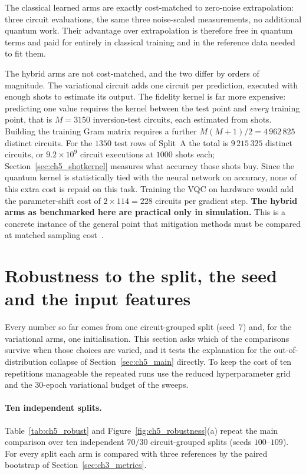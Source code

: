 \documentclass[Thesis.tex]{subfiles}
\begin{document}
The classical learned arms are exactly cost-matched to zero-noise extrapolation:
three circuit evaluations, the same three noise-scaled measurements, no additional
quantum work. Their advantage over extrapolation is therefore free in quantum terms
and paid for entirely in classical training and in the reference data needed to fit
them.

The hybrid arms are not cost-matched, and the two differ by orders of magnitude.
The variational circuit adds one circuit per prediction, executed with enough shots
to estimate its output. The fidelity kernel is far more expensive: predicting one
value requires the kernel between the test point and \emph{every} training point,
that is $M = 3150$ inversion-test circuits, each estimated from shots. Building the
training Gram matrix requires a further $M(M+1)/2 = 4\,962\,825$ distinct circuits.
For the $1350$ test rows of Split~A the total is $9\,215\,325$ distinct circuits,
or $9.2 \times 10^{9}$ circuit executions at $1000$ shots each;
Section~\ref{sec:ch5_shotkernel} measures what accuracy those shots buy. Since the
quantum kernel is statistically tied with the neural network on accuracy, none of
this extra cost is repaid on this task. Training the VQC on hardware would add the
parameter-shift cost of $2 \times 114 = 228$ circuits per gradient step.
\textbf{The hybrid arms as benchmarked here are practical only in simulation.} This is a concrete instance of the general point that mitigation
methods must be compared at matched sampling cost~\cite{takagi2022fundamental}.

\section{Robustness to the split, the seed and the input features}
\label{sec:ch5_robustness}

Every number so far comes from one circuit-grouped split (seed~7) and, for the
variational arms, one initialisation. This section asks which of the comparisons
survive when those choices are varied, and it tests the explanation for the
out-of-distribution collapse of Section~\ref{sec:ch5_main} directly. To keep the
cost of ten repetitions manageable the repeated runs use the reduced
hyperparameter grid and the $30$-epoch variational budget of the sweeps.

\paragraph{Ten independent splits.} Table~\ref{tab:ch5_robust} and
Figure~\ref{fig:ch5_robustness}(a) repeat the main comparison over ten independent
$70/30$ circuit-grouped splits (seeds $100$--$109$). For every split each arm is
compared with three references by the paired bootstrap of
Section~\ref{sec:ch3_metrics}.
\end{document}
